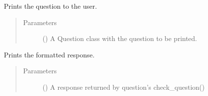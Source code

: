 \documentclass[letterpaper,10pt,english]{sphinxmanual}
\begin{document}

\begin{fulllineitems}
\label{\detokenize{index:birdears.interfaces.commandline.print_question}}
\sphinxAtStartPar
Prints the question to the user.
\begin{quote}\begin{description}
\item[{Parameters}] \leavevmode
\sphinxAtStartPar
{} () \textendash{} A Question class with the question to be printed.

\end{description}\end{quote}

\end{fulllineitems}


\begin{fulllineitems}
\label{\detokenize{index:birdears.interfaces.commandline.print_response}}
\sphinxAtStartPar
Prints the formatted response.
\begin{quote}\begin{description}
\item[{Parameters}] \leavevmode
\sphinxAtStartPar
{} () \textendash{} A response returned by question’s check\_question()

\end{description}\end{quote}

\end{fulllineitems}
\end{document}
